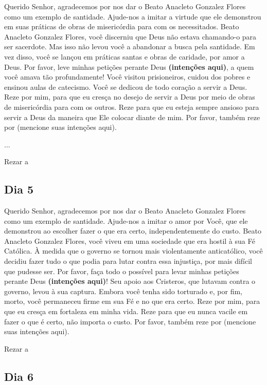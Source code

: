 \documentclass[a4paper,14pt,twoside]{extarticle} \usepackage[utf8]{inputenc}
\begin{document}
Querido Senhor, agradecemos por nos dar o Beato Anacleto Gonzalez Flores como um exemplo de santidade. Ajude-nos a imitar a virtude que ele demonstrou em suas práticas de obras de misericórdia para com os necessitados. Beato Anacleto Gonzalez Flores, você discerniu que Deus não estava chamando-o para ser sacerdote. Mas isso não levou você a abandonar a busca pela santidade. Em vez disso, você se lançou em práticas santas e obras de caridade, por amor a Deus. Por favor, leve minhas petições perante Deus \textbf{(intenções aqui)}, a quem você amava tão profundamente! Você visitou prisioneiros, cuidou dos pobres e ensinou aulas de catecismo. Você se dedicou de todo coração a servir a Deus. Reze por mim, para que eu cresça no desejo de servir a Deus por meio de obras de misericórdia para com os outros. Reze para que eu esteja sempre ansioso para servir a Deus da maneira que Ele colocar diante de mim. Por favor, também reze por (mencione suas intenções aqui). 

...


Rezar a \textbf{}

\subsection{Dia 5}

Querido Senhor, agradecemos por nos dar o Beato Anacleto Gonzalez Flores como um exemplo de santidade. Ajude-nos a imitar o amor por Você, que ele demonstrou ao escolher fazer o que era certo, independentemente do custo. Beato Anacleto Gonzalez Flores, você viveu em uma sociedade que era hostil à sua Fé Católica. À medida que o governo se tornou mais violentamente anticatólico, você decidiu fazer tudo o que podia para lutar contra essa injustiça, por mais difícil que pudesse ser. Por favor, faça todo o possível para levar minhas petições perante Deus \textbf{(intenções aqui)}! Seu apoio aos Cristeros, que lutavam contra o governo, levou à sua captura. Embora você tenha sido torturado e, por fim, morto, você permaneceu firme em sua Fé e no que era certo. Reze por mim, para que eu cresça em fortaleza em minha vida. Reze para que eu nunca vacile em fazer o que é certo, não importa o custo. Por favor, também reze por (mencione suas intenções aqui). 

Rezar a \textbf{}

\subsection{Dia 6}
\end{document}
